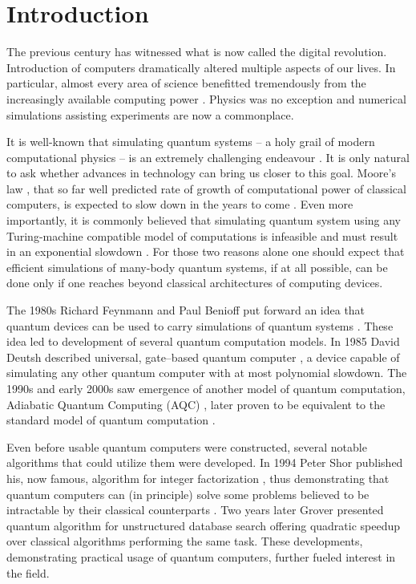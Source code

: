 \chapter*{Introduction}
The previous century has witnessed what is now called the digital revolution. Introduction of computers dramatically altered multiple aspects of our lives. In particular, almost every area of science benefitted tremendously from the increasingly available computing power \cite{winsberg}. Physics was no exception and numerical simulations assisting experiments are now a commonplace.

It is well-known that simulating quantum systems -- a holy grail of modern computational physics -- is an extremely challenging endeavour \cite{feynman.82}. It is only natural to ask whether advances in technology can bring us closer to this goal.  Moore's law \cite{mack}, that so far well predicted rate of growth of computational power of classical computers, is expected to slow down in the years to come \cite{waldrop, kumar}. Even more importantly, it is commonly believed that simulating quantum system using any Turing-machine compatible model of computations is infeasible and must result in an exponential slowdown \cite{feynman.82, poplavskii}. For those two reasons alone one should expect that efficient simulations of many-body quantum systems, if at all possible, can be done only if one reaches beyond classical architectures of computing devices.

The 1980s Richard Feynmann and Paul Benioff put forward an idea that quantum devices can be used to carry simulations of quantum systems \cite{feynman.82,benioff.80}. These idea led to development of several quantum computation models. In 1985 David Deutsh described universal, gate--based quantum computer  \cite{deutsch}, a device capable of simulating any other quantum computer with at most polynomial slowdown. The 1990s and early 2000s saw emergence of another model of quantum computation, Adiabatic Quantum Computing (AQC) \cite{kadowaki,farhi}, later proven to be equivalent to the standard model of quantum computation \cite{aharonov}.

Even before usable quantum computers were constructed, several notable algorithms that could utilize them were developed. In 1994 Peter Shor published his, now famous, algorithm for integer factorization \cite{shor}, thus demonstrating that quantum computers can (in principle) solve some problems believed to be intractable by their classical counterparts \cite{kleinjung}. Two years later Grover presented quantum algorithm for unstructured database search \cite{grover} offering quadratic speedup over classical algorithms performing the same task. These developments, demonstrating practical usage of quantum computers, further fueled interest in the field.

